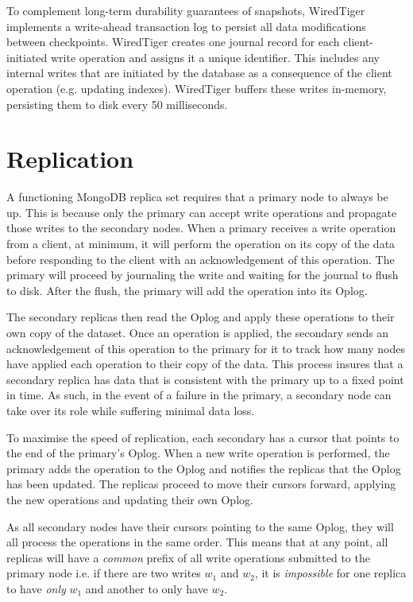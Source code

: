 To complement long-term durability guarantees of snapshots, WiredTiger implements a write-ahead transaction log to persist all data modifications between checkpoints. WiredTiger creates one journal record for each client-initiated write operation and assigns it a unique identifier. This includes any internal writes that are initiated by the database as a consequence of the client operation (e.g. updating indexes). WiredTiger buffers these writes in-memory, persisting them to disk every 50 milliseconds.

\section{Replication}
\label{sec:replication}
A functioning MongoDB replica set requires that a primary node to always be up. This is because only the primary can accept write operations and propagate those writes to the secondary nodes. When a primary receives a write operation from a client, at minimum, it will perform the operation on its copy of the data before responding to the client with an acknowledgement of this operation. The primary will proceed by journaling the write and waiting for the journal to flush to disk. After the flush, the primary will add the operation into its Oplog.

The secondary replicas then read the Oplog and apply these operations to their own copy of the dataset. Once an operation is applied, the secondary sends an acknowledgement of this operation to the primary for it to track how many nodes have applied each operation to their copy of the data. This process insures that a secondary replica has data that is consistent with the primary up to a fixed point in time. As such, in the event of a failure in the primary, a secondary node can take over its role while suffering minimal data loss.

To maximise the speed of replication, each secondary has a cursor that points to the end of the primary's Oplog. When a new write operation is performed, the primary adds the operation to the Oplog and notifies the replicas that the Oplog has been updated. The replicas proceed to move their cursors forward, applying the new operations and updating their own Oplog. 

As all secondary nodes have their cursors pointing to the same Oplog, they will all process the operations in the same order. This means that at any point, all replicas will have a \textit{common} prefix of all write operations submitted to the primary node i.e. if there are two writes $w_1$ and $w_2$, it is \textit{impossible} for one replica to have \textit{only} $w_1$ and another to only have $w_2$.

